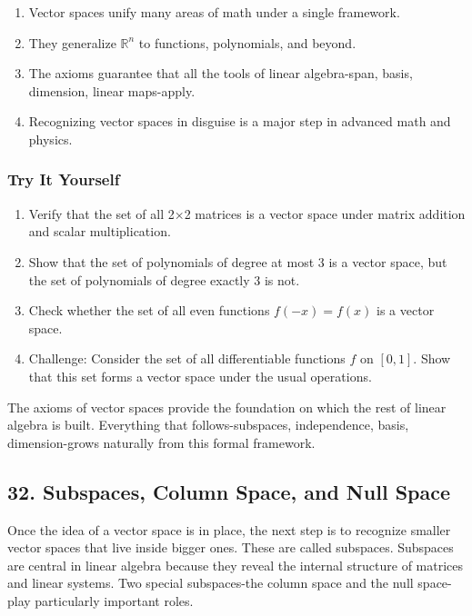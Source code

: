\documentclass[
  letterpaper,
  DIV=11,
  numbers=noendperiod]{scrreprt}
\providecommand{\tightlist}{%
  \setlength{\itemsep}{0pt}\setlength{\parskip}{0pt}}
\begin{document}
\begin{enumerate}
\def\labelenumi{\arabic{enumi}.}
\tightlist
\item
  Vector spaces unify many areas of math under a single framework.
\item
  They generalize \(\mathbb{R}^n\) to functions, polynomials, and
  beyond.
\item
  The axioms guarantee that all the tools of linear algebra-span, basis,
  dimension, linear maps-apply.
\item
  Recognizing vector spaces in disguise is a major step in advanced math
  and physics.
\end{enumerate}

\subsubsection{Try It Yourself}\label{try-it-yourself-30}

\begin{enumerate}
\def\labelenumi{\arabic{enumi}.}
\tightlist
\item
  Verify that the set of all 2×2 matrices is a vector space under matrix
  addition and scalar multiplication.
\item
  Show that the set of polynomials of degree at most 3 is a vector
  space, but the set of polynomials of degree exactly 3 is not.
\item
  Check whether the set of all even functions \(f(-x) = f(x)\) is a
  vector space.
\item
  Challenge: Consider the set of all differentiable functions \(f\) on
  \([0,1]\). Show that this set forms a vector space under the usual
  operations.
\end{enumerate}

The axioms of vector spaces provide the foundation on which the rest of
linear algebra is built. Everything that follows-subspaces,
independence, basis, dimension-grows naturally from this formal
framework.

\subsection{32. Subspaces, Column Space, and Null
Space}\label{subspaces-column-space-and-null-space}

Once the idea of a vector space is in place, the next step is to
recognize smaller vector spaces that live inside bigger ones. These are
called subspaces. Subspaces are central in linear algebra because they
reveal the internal structure of matrices and linear systems. Two
special subspaces-the column space and the null space-play particularly
important roles.
\end{document}
